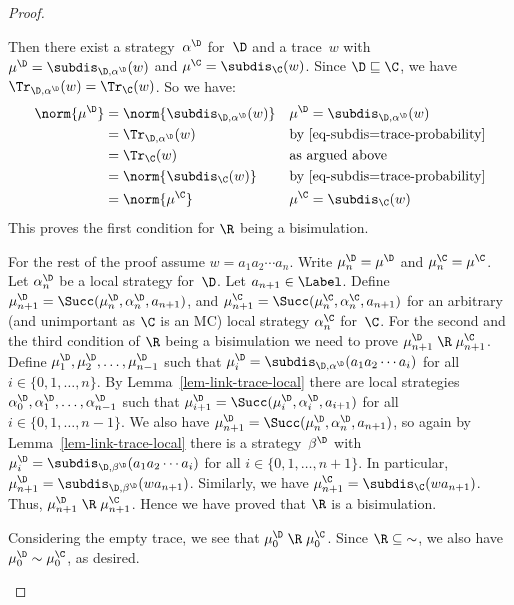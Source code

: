 \begin{proof}
\begin{itemize}[align=left]
Then there exist a strategy~$\alpha^{\D}$ for~$\D$ and a trace~$w$ with
$\mu^{\D} = \subdis_{\D,\alpha^{\D}}(w)$ and $\mu^\C = \subdis_{\C}(w)$.
Since $\D \sqsubseteq \C$, we have $\Tr_{\D,\alpha^{\D}}(w) = \Tr_{\C}(w)$.
So we have:
\begin{align*}
\norm{\mu^{\D}}
& = \norm{\subdis_{\D,\alpha^{\D}}(w)} && \mu^{\D} = \subdis_{\D,\alpha^{\D}}(w) \\
& = \Tr_{\D,\alpha^{\D}}(w) && \text{by~\eqref{eq-subdis=trace-probability}} \\
& = \Tr_{\C}(w)       && \text{as argued above} \\
& = \norm{\subdis_{\C}(w)} && \text{by~\eqref{eq-subdis=trace-probability}} \\
& = \norm{\mu^{\C}} && \mu^{\C} = \subdis_{\C}(w)
\end{align*}
This proves the first condition for $\R$ being a bisimulation.

For the rest of the proof assume $w = a_1 a_2 \cdots a_n$.
Write $\mu^{\D}_n = \mu^{\D}$ and $\mu^{\C}_n = \mu^{\C}$.
Let $\alpha^{\D}_n$ be a local strategy for~$\D$.
Let $a_{n+1} \in \Label$.
Define $\mu^{\D}_{n+1} = \Succ(\mu^{\D}_n, \alpha^{\D}_n, a_{n+1})$,
   and $\mu^{\C}_{n+1} = \Succ(\mu^{\C}_n, \alpha^{\C}_n, a_{n+1})$ for an arbitrary (and unimportant as $\C$ is an MC) local strategy $\alpha^{\C}_n$ for~$\C$.
For the second and the third condition of $\R$ being a bisimulation we need to prove
$\mu^{\D}_{n+1} \mathrel{\R} \mu^{\C}_{n+1}$.
Define $\mu^{\D}_1, \mu^{\D}_2, \ldots, \mu^{\D}_{n-1}$ such that
$\mu^{\D}_i = \subdis_{\D,\alpha^{\D}}(a_1 a_2 \cdots a_i)$ for all $i \in \{0, 1, \ldots, n\}$.
By Lemma~\ref{lem-link-trace-local} there are local strategies $\alpha^{\D}_0, \alpha^{\D}_1, \ldots, \alpha^{\D}_{n-1}$
such that $\mu^{\D}_{i+1} = \Succ(\mu^{\D}_i, \alpha^{\D}_i, a_{i+1})$ for all $i \in \{0, 1, \ldots, n-1\}$.
We also have $\mu^{\D}_{n+1} = \Succ(\mu^{\D}_n, \alpha^{\D}_n, a_{n+1})$,
so again by Lemma~\ref{lem-link-trace-local} there is a strategy~$\beta^{\D}$ with
$\mu^{\D}_i = \subdis_{\D,\beta^{\D}}(a_1 a_2 \cdots a_i)$ for all $i \in \{0, 1, \ldots, n+1\}$. In particular, $\mu^{\D}_{n+1} = \subdis_{\D,\beta^{\D}}(w a_{n+1})$.
Similarly, we have $\mu^{\C}_{n+1} = \subdis_{\C}(w a_{n+1})$.
Thus, $\mu^{\D}_{n+1} \mathrel{\R} \mu^{\C}_{n+1}$.
Hence we have proved that $\R$ is a bisimulation.

Considering the empty trace, we see that $\mu^{\D}_0 \mathrel{\R} \mu^{\C}_0$.
Since $\R \subseteq \mathord{\sim}$, we also have $\mu^{\D}_0 \sim \mu^{\C}_0$, as desired. \qedhere
\end{itemize}
\end{proof}


